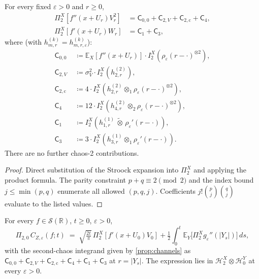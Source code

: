 \documentclass[EJP]{ejpecp}
\newcommand{\R}{\mathbb{R}}
\renewcommand{\E}{\mathbb{E}}
\newcommand{\Hilb}{\mathcal{H}}
\newcommand{\IBM}{Z}
\newcommand{\Pir}{\Pi}
\newcommand{\Channel}[1]{\mathsf{C}_{#1}}
\begin{document}
\begin{proposition}\label{prop:channels}
For every fixed $\varepsilon>0$ and $r\ge 0$,
\begin{align*}
 \Pir_2^X[f''(x+U_r)V_r^{2}]
 &=\Channel{0,0}+\Channel{2,V}+\Channel{2,\mathrm{c}}+\Channel{4},\\
 \Pir_2^X[f'(x+U_r)W_r]
 &=\Channel{1}+\Channel{3},
\end{align*}
where (with $h^{(k)}_{m,r}=h^{(k)}_{m,r,\varepsilon}$):
\begin{align*}
 \Channel{0,0}\,\,&\coloneqq\E_X[f''(x+U_r)]\cdot I_2^X(\rho_\varepsilon(r-\cdot)^{\otimes 2}),\\
 \Channel{2,V}&\coloneqq\sigma_V^{2}\cdot I_2^X(h^{(2)}_{2,r}),\\
 \Channel{2,\mathrm{c}}&\coloneqq 4\cdot I_2^X(h^{(2)}_{2,r}\otimes_1\rho_\varepsilon(r-\cdot)^{\otimes 2}),\\
 \Channel{4}&\coloneqq 12\cdot I_2^X(h^{(2)}_{4,r}\otimes_2\rho_\varepsilon(r-\cdot)^{\otimes 2}),\\
 \Channel{1}&\coloneqq I_2^X(h^{(1)}_{1,r}\,\widetilde\otimes\,\rho_\varepsilon'(r-\cdot)),\\
 \Channel{3}&\coloneqq 3\cdot I_2^X(h^{(1)}_{3,r}\otimes_1\rho_\varepsilon'(r-\cdot)).
\end{align*}
There are no further chaos-2 contributions.
\end{proposition}

\begin{proof}
Direct substitution of the Stroock expansion into $\Pir_2^X$ and
applying the product formula. The parity constraint
$p+q\equiv 2\pmod 2$ and the index bound $j\le\min(p,q)$ enumerate
all allowed $(p,q,j)$. Coefficients $j!\binom{p}{j}\binom{q}{j}$
evaluate to the listed values.
\end{proof}

\begin{theorem}
\label{thm:2-0}
For every $f\in\mathscr S(\R)$, $t\ge 0$, $\varepsilon>0$,
\begin{equation}\label{eq:2-0-explicit}
 \Pir_{2,0}\,C_{\IBM,\varepsilon}(f;t)
 \;=\;\sqrt{\tfrac{2t}{\pi}}\,\Pir_2^X[f'(x+U_0)V_0]
   +\tfrac12\!\int_0^t\!\E_Y\!\bigl[\Pir_2^X g_\varepsilon''(|Y_s|)\bigr]\,ds,
\end{equation}
with the second-chaos integrand given by \cref{prop:channels} as
$\Channel{0,0}+\Channel{2,V}+\Channel{2,\mathrm{c}}+\Channel{4}+\Channel{1}+\Channel{3}$
at $r=|Y_s|$. The expression lies in $\Hilb_2^X\otimes\Hilb_0^Y$ at
every $\varepsilon>0$.
\end{theorem}
\end{document}
